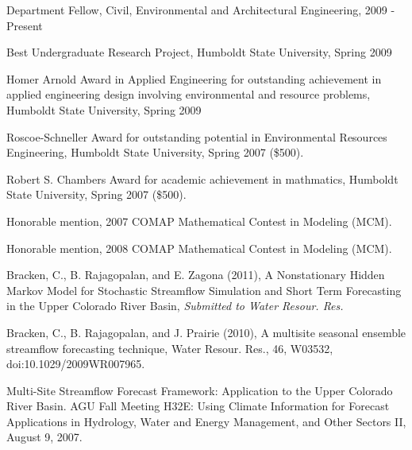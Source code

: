 \documentclass[10pt,a4paper]{scrartcl}
\begin{document}
\begin{cv}{}
        \begin{cvlist}{}\label{awards}
            \item   Department Fellow, Civil, Environmental and Architectural Engineering, 2009 - Present
            \item   Best Undergraduate Research Project, Humboldt State University, Spring 2009
            \item   Homer Arnold Award in Applied Engineering for outstanding achievement in applied engineering design involving environmental and resource problems, Humboldt State University, Spring 2009 
            \item   Roscoe-Schneller Award for outstanding potential in Environmental Resources Engineering, Humboldt State University, Spring 2007 (\$500).

	        \item Robert S. Chambers Award for academic achievement in mathmatics, Humboldt State University, Spring 2007 (\$500).

	        \item Honorable mention, 2007 COMAP Mathematical Contest in Modeling (MCM).
	
	        \item Honorable mention, 2008 COMAP Mathematical Contest in Modeling (MCM).
        \end{cvlist}
        
        \begin{cvlist}{}\label{pub}
	        \item Bracken, C., B. Rajagopalan, and E. Zagona (2011), A Nonstationary Hidden Markov Model for Stochastic Streamflow Simulation and Short Term Forecasting in the Upper Colorado River Basin, {\it Submitted to Water Resour. Res.} 
            \item   Bracken, C., B. Rajagopalan, and J. Prairie (2010), A multisite seasonal ensemble streamflow forecasting technique, Water Resour. Res., 46, W03532, doi:10.1029/2009WR007965.
        \end{cvlist}
        \begin{cvlist}{}\label{pres}
            \item   Multi-Site Streamflow Forecast Framework: Application to the Upper Colorado River Basin. AGU Fall Meeting H32E: Using Climate Information for Forecast Applications in Hydrology, Water and Energy Management, and Other Sectors II, August 9, 2007.
        \end{cvlist}
    \end{cv}
\end{document}

